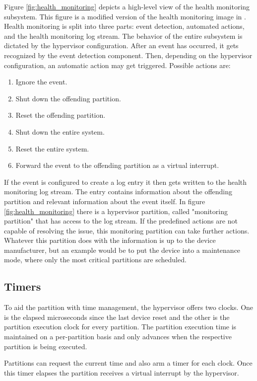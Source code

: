 Figure \ref{fig:health_monitoring} depicts a high-level view of the health monitoring subsystem. This figure is a modified version of the health monitoring image in \cite{xtratum3}. Health monitoring is split into three parts: event detection, automated actions, and the health monitoring log stream. The behavior of the entire subsystem is dictated by the hypervisor configuration.
After an event has occurred, it gets recognized by the event detection component. Then, depending on the hypervisor configuration, an automatic action may get triggered. Possible actions are:
\begin{enumerate}
    \item Ignore the event.
    \item Shut down the offending partition.
    \item Reset the offending partition.
    \item Shut down the entire system.
    \item Reset the entire system.
    \item Forward the event to the offending partition as a virtual interrupt.
\end{enumerate}

If the event is configured to create a log entry it then gets written to the health monitoring log stream. The entry contains information about the offending partition and relevant information about the event itself. In figure \ref{fig:health_monitoring} there is a hypervisor partition, called "monitoring partition" that has access to the log stream. If the predefined actions are not capable of resolving the issue, this monitoring partition can take further actions. Whatever this partition does with the information is up to the device manufacturer, but an example would be to put the device into a maintenance mode, where only the most critical partitions are scheduled. 

\subsection{Timers}
To aid the partition with time management, the hypervisor offers two clocks. One is the elapsed microseconds since the last device reset and the other is the partition execution clock for every partition. The partition execution time is maintained on a per-partition basis and only advances when the respective partition is being executed.

Partitions can request the current time and also arm a timer for each clock. Once this timer elapses the partition receives a virtual interrupt by the hypervisor. 
